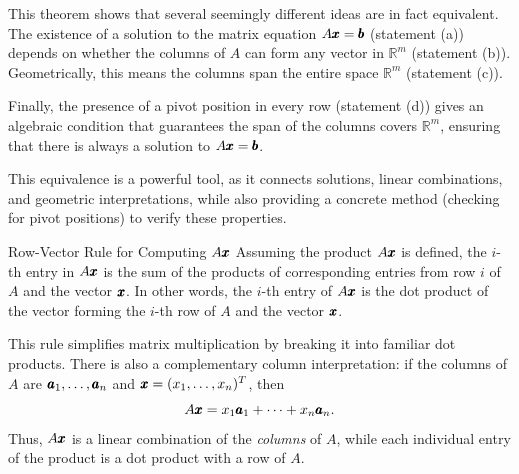 This theorem shows that several seemingly different ideas are in fact equivalent. The existence of a solution to the matrix equation \( A \pmb{x} = \pmb{b} \) (statement (a)) depends on whether the columns of \( A \) can form any vector in \( \mathbb{R}^m \) (statement (b)). Geometrically, this means the columns span the entire space \( \mathbb{R}^m \) (statement (c)).

Finally, the presence of a pivot position in every row (statement (d)) gives an algebraic condition that guarantees the span of the columns covers \( \mathbb{R}^m \), ensuring that there is always a solution to \( A \pmb{x} = \pmb{b} \).

This equivalence is a powerful tool, as it connects solutions, linear combinations, and geometric interpretations, while also providing a concrete method (checking for pivot positions) to verify these properties.

\begin{custombox}{Row-Vector Rule for Computing \( A \pmb{x} \)}
Assuming the product \( A \pmb{x} \) is defined, the \( i \)-th entry in \( A \pmb{x} \) is the sum of the products of corresponding entries from row \( i \) of \( A \) and the vector \( \pmb{x} \). In other words, the \( i \)-th entry of \( A \pmb{x} \) is the dot product of the vector forming the \( i \)-th row of \( A \) and the vector \( \pmb{x} \).
    
\end{custombox}


This rule simplifies matrix multiplication by breaking it into familiar dot products. There is also a complementary column interpretation: if the columns of $A$ are $\pmb{a}_1,\ldots,\pmb{a}_n$ and $\pmb{x}=(x_1,\ldots,x_n)^T$, then
\[
A\pmb{x}=x_1\pmb{a}_1+\cdots+x_n\pmb{a}_n.
\]
Thus, $A\pmb{x}$ is a linear combination of the \emph{columns} of $A$, while each individual entry of the product is a dot product with a row of $A$.

